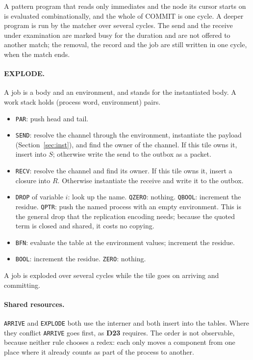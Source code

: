 \documentclass[11pt]{article}
\newcommand{\kw}[1]{\texttt{#1}}
\newcommand{\dec}[1]{\textbf{D#1}}
\theoremstyle{definition}
\theoremstyle{remark}
\begin{document}
A pattern program that reads only immediates and the node its cursor starts
on is evaluated combinationally, and the whole of COMMIT is one cycle. A
deeper program is run by the matcher over several cycles. The send and the
receive under examination are marked busy for the duration and are not
offered to another match; the removal, the record and the job are still
written in one cycle, when the match ends.

\paragraph{EXPLODE.} A job is a body and an environment, and stands for the
instantiated body. A work stack holds (process word, environment) pairs.
\begin{itemize}
\item \kw{PAR}: push head and tail.
\item \kw{SEND}: resolve the channel through the environment, instantiate
the payload (Section~\ref{sec:inst}), and find the owner of the channel. If
this tile owns it, insert into $S$; otherwise write the send to the outbox
as a packet.
\item \kw{RECV}: resolve the channel and find its owner. If this tile owns
it, insert a closure into $R$. Otherwise instantiate the receive and write it
to the outbox.
\item \kw{DROP} of variable $i$: look up the name. \kw{QZERO}: nothing.
\kw{QBOOL}: increment the residue. \kw{QPTR}: push the named process with an
empty environment. This is the general drop that the replication encoding
needs; because the quoted term is closed and shared, it costs no copying.
\item \kw{BFN}: evaluate the table at the environment values; increment the
residue.
\item \kw{BOOL}: increment the residue. \kw{ZERO}: nothing.
\end{itemize}
A job is exploded over several cycles while the tile goes on arriving and
committing.

\paragraph{Shared resources.} \kw{ARRIVE} and \kw{EXPLODE} both use the
interner and both insert into the tables. Where they conflict \kw{ARRIVE}
goes first, as \dec{23} requires. The order is not observable, because
neither rule chooses a redex: each only moves a component from one place
where it already counts as part of the process to another.
\end{document}

